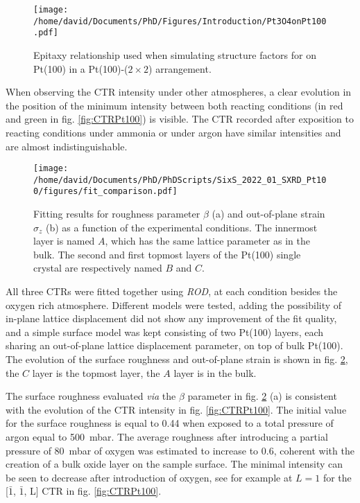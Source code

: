 \begin{figure}[!htb]
    \centering
    \texttt{[image: /home/david/Documents/PhD/Figures/Introduction/Pt3O4onPt100.pdf]}
    \caption{
    Epitaxy relationship used when simulating structure factors for  on Pt(100) in a Pt(100)-($2\times2$) arrangement.
    }
    \label{fig:Pt3O4onPt100}
\end{figure}

When observing the CTR intensity under other atmospheres, a clear evolution in the position of the minimum intensity between both reacting conditions (in red and green in fig. \ref{fig:CTRPt100}) is visible.
The CTR recorded after exposition to reacting conditions under ammonia or under argon have similar intensities and are almost indistinguishable.

\begin{figure}[!htb]
    \centering
    \texttt{[image: /home/david/Documents/PhD/PhDScripts/SixS\_2022\_01\_SXRD\_Pt100/figures/fit\_comparison.pdf]}
    \caption{
        Fitting results for roughness parameter $\beta$ (a) and out-of-plane strain $\sigma_z$ (b) as a function of the experimental conditions.
        The innermost layer is named $A$, which has the same lattice parameter as in the bulk.
        The second and first topmost layers of the Pt(100) single crystal are respectively named $B$ and $C$.
    }
    \label{fig:CTRFit100}
\end{figure}

All three CTRs were fitted together using \textit{ROD}, at each condition besides the oxygen rich atmosphere.
Different models were tested, adding the possibility of in-plane lattice displacement did not show any improvement of the fit quality, and a simple surface model was kept consisting of two Pt(100) layers, each sharing an out-of-plane lattice displacement parameter, on top of bulk Pt(100).
The evolution of the surface roughness and out-of-plane strain is shown in fig. \ref{fig:CTRFit100}, the $C$ layer is the topmost layer, the $A$ layer is in the bulk.

The surface roughness evaluated \textit{via} the $\beta$ parameter in fig. \ref{fig:CTRFit100} (a) is consistent with the evolution of the CTR intensity in fig. \ref{fig:CTRPt100}.
The initial value for the surface roughness is equal to \num{0.44} when exposed to a total pressure of argon equal to \qty{500}{\milli\bar}.
The average roughness after introducing a partial pressure of \qty{80}{\milli\bar} of oxygen was estimated to increase to \num{0.6}, coherent with the creation of a bulk oxide layer on the sample surface.
The minimal intensity can be seen to decrease after introduction of oxygen, see for example at $L=1$ for the [$\bar{1}$, $\bar{1}$, L] CTR in fig. \ref{fig:CTRPt100}.


